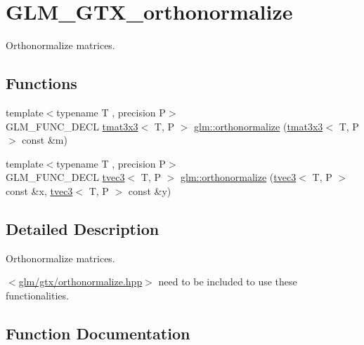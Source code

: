 \hypertarget{group__gtx__orthonormalize}{}\section{G\+L\+M\+\_\+\+G\+T\+X\+\_\+orthonormalize}
\label{group__gtx__orthonormalize}


Orthonormalize matrices.  


\subsection*{Functions}
\begin{DoxyCompactItemize}
\item 
{\footnotesize template$<$typename T , precision P$>$ }\\G\+L\+M\+\_\+\+F\+U\+N\+C\+\_\+\+D\+E\+CL \hyperlink{structglm_1_1tmat3x3}{tmat3x3}$<$ T, P $>$ \hyperlink{group__gtx__orthonormalize_ga23c4340b8f1559d259229b6d8bdc3f97}{glm\+::orthonormalize} (\hyperlink{structglm_1_1tmat3x3}{tmat3x3}$<$ T, P $>$ const \&m)
\item 
{\footnotesize template$<$typename T , precision P$>$ }\\G\+L\+M\+\_\+\+F\+U\+N\+C\+\_\+\+D\+E\+CL \hyperlink{structglm_1_1tvec3}{tvec3}$<$ T, P $>$ \hyperlink{group__gtx__orthonormalize_gad7afff30d7323fdc7aed7f5a16a0c596}{glm\+::orthonormalize} (\hyperlink{structglm_1_1tvec3}{tvec3}$<$ T, P $>$ const \&x, \hyperlink{structglm_1_1tvec3}{tvec3}$<$ T, P $>$ const \&y)
\end{DoxyCompactItemize}


\subsection{Detailed Description}
Orthonormalize matrices. 

$<$\hyperlink{orthonormalize_8hpp}{glm/gtx/orthonormalize.\+hpp}$>$ need to be included to use these functionalities. 

\subsection{Function Documentation}
\mbox{\label{group__gtx__orthonormalize_ga23c4340b8f1559d259229b6d8bdc3f97}} 
